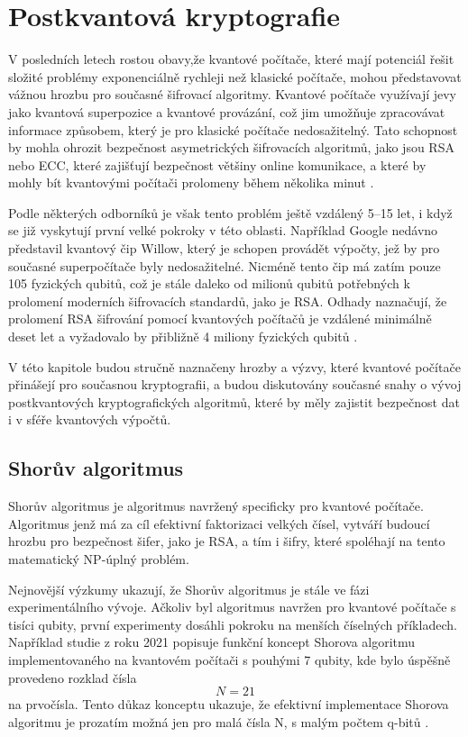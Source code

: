 \section{Postkvantová kryptografie}
\label{sec:postkvantova-kryptografie}
V posledních letech rostou obavy,že kvantové počítače, které mají potenciál řešit složité problémy exponenciálně rychleji než klasické počítače, mohou představovat vážnou hrozbu pro současné šifrovací algoritmy. Kvantové počítače využívají jevy jako kvantová superpozice a kvantové provázání, což jim umožňuje zpracovávat informace způsobem, který je pro klasické počítače nedosažitelný. Tato schopnost by mohla ohrozit bezpečnost asymetrických šifrovacích algoritmů, jako jsou RSA nebo ECC, které zajišťují bezpečnost většiny online komunikace, a které by mohly bít kvantovými počítači prolomeny během několika minut \parencite{qubits2024}.

Podle některých odborníků je však tento problém ještě vzdálený 5--15 let, i když se již vyskytují první velké pokroky v této oblasti. Například Google nedávno představil kvantový čip Willow, který je schopen provádět výpočty, jež by pro současné superpočítače byly nedosažitelné. Nicméně tento čip má zatím pouze 105 fyzických qubitů, což je stále daleko od milionů qubitů potřebných k prolomení moderních šifrovacích standardů, jako je RSA. Odhady naznačují, že prolomení RSA šifrování pomocí kvantových počítačů je vzdálené minimálně deset let a vyžadovalo by přibližně 4 miliony fyzických qubitů \parencite{qubits2024}.

V této kapitole budou stručně naznačeny hrozby a výzvy, které kvantové počítače přinášejí pro současnou kryptografii, a budou diskutovány současné snahy o vývoj postkvantových kryptografických algoritmů, které by měly zajistit bezpečnost dat i v sféře kvantových výpočtů.

\subsection{Shorův algoritmus}
Shorův algoritmus je algoritmus navržený specificky pro kvantové počítače. Algoritmus jenž má za cíl efektivní faktorizaci velkých čísel, vytváří budoucí hrozbu pro bezpečnost šifer, jako je RSA, a tím i šifry, které spoléhají na tento matematický NP-úplný problém.

Nejnovější výzkumy ukazují, že Shorův algoritmus je stále ve fázi experimentálního vývoje. Ačkoliv byl algoritmus navržen pro kvantové počítače s tisíci qubity, první experimenty dosáhli pokroku na menších číselných příkladech. Například studie z roku 2021 popisuje funkční koncept Shorova algoritmu implementovaného na kvantovém počítači s pouhými 7 qubity, kde bylo úspěšně provedeno rozklad čísla \[N = 21\] na prvočísla. Tento důkaz konceptu ukazuje, že efektivní implementace Shorova algoritmu je prozatím možná jen pro malá čísla N, s malým počtem q-bitů \parencite{skosana2021}.

